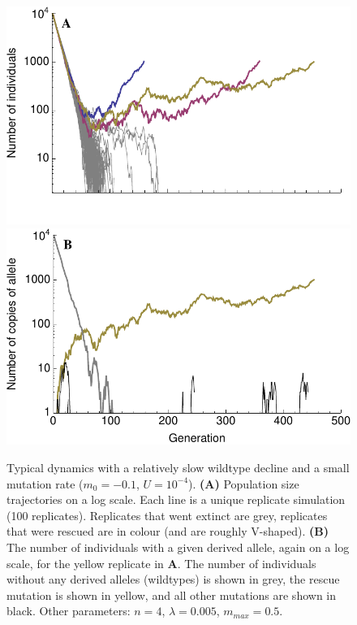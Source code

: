 \documentclass[9pt,twocolumn,twoside,lineno]{gsajnl}
\begin{document}
\begin{figure}[!h]
\centering
\includegraphics[width=\linewidth]{Vshape.pdf}\\
\includegraphics[width=\linewidth]{VshapeMutations.pdf}
\caption{
Typical dynamics with a relatively slow wildtype decline and a small mutation rate ($m_0 = -0.1$, $U=10^{-4}$).
\textbf{(A)} Population size trajectories on a log scale.
Each line is a unique replicate simulation (100 replicates).
Replicates that went extinct are grey, replicates that were rescued are in colour (and are roughly V-shaped).
\textbf{(B)} The number of individuals with a given derived allele, again on a log scale, for the yellow replicate in \textbf{A}.
The number of individuals without any derived alleles (wildtypes) is shown in grey, the rescue mutation is shown in yellow, and all other mutations are shown in black.
Other parameters: $n=4$, $\lambda=0.005$, $m_{max}=0.5$.
}%
\label{fig:Vshape}
\end{figure}
\end{document}
